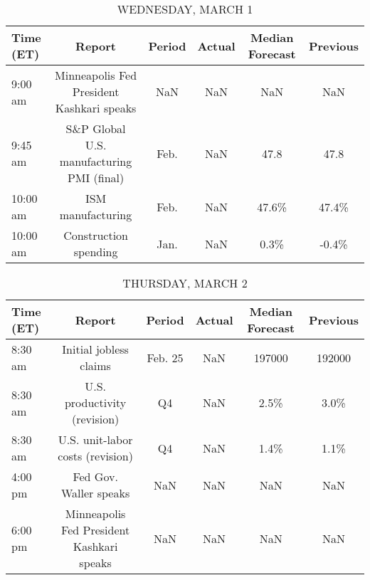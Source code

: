 \documentclass{article}%
\begin{document}
%


\begin{table}[htbp]%
\caption{WEDNESDAY, MARCH 1}%
\centering%
\begin{adjustbox}{width=1\textwidth}%
\begin{tabular}{lccccc}
\toprule
Time (ET) &                                    Report & Period & Actual & Median Forecast & Previous \\
\midrule
  9:00 am & Minneapolis Fed President Kashkari speaks &    NaN &    NaN &             NaN &      NaN \\
  9:45 am & S\&P Global U.S. manufacturing PMI (final) &   Feb. &    NaN &            47.8 &     47.8 \\
 10:00 am &                         ISM manufacturing &   Feb. &    NaN &           47.6\% &    47.4\% \\
 10:00 am &                     Construction spending &   Jan. &    NaN &            0.3\% &    -0.4\% \\
\bottomrule
\end{tabular}
%
\end{adjustbox}%
\end{table}

%


\begin{table}[htbp]%
\caption{THURSDAY, MARCH 2}%
\centering%
\begin{adjustbox}{width=1\textwidth}%
\begin{tabular}{lccccc}
\toprule
Time (ET) &                                    Report &  Period & Actual & Median Forecast & Previous \\
\midrule
  8:30 am &                    Initial jobless claims & Feb. 25 &    NaN &          197000 &   192000 \\
  8:30 am &              U.S. productivity (revision) &      Q4 &    NaN &            2.5\% &     3.0\% \\
  8:30 am &          U.S. unit-labor costs (revision) &      Q4 &    NaN &            1.4\% &     1.1\% \\
  4:00 pm &                    Fed Gov. Waller speaks &     NaN &    NaN &             NaN &      NaN \\
  6:00 pm & Minneapolis Fed President Kashkari speaks &     NaN &    NaN &             NaN &      NaN \\
\bottomrule
\end{tabular}
%
\end{adjustbox}%
\end{table}
\end{document}
